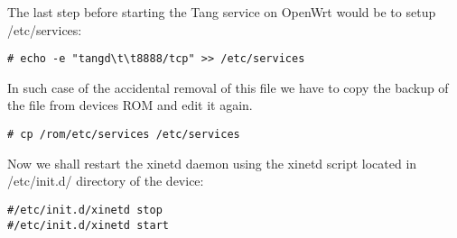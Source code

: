 The last step before starting the Tang service on OpenWrt would be to setup /etc/services:
\begin{lstlisting}[columns=fixed,basicstyle=\ttfamily\footnotesize,tabsize=4,backgroundcolor=\color{yellow!10}]
# echo -e "tangd\t\t8888/tcp" >> /etc/services
\end{lstlisting}
In such case of the accidental removal of this file we have to copy the backup of the file from devices ROM and edit it again.
\begin{lstlisting}[columns=fixed,basicstyle=\ttfamily\footnotesize,tabsize=4,backgroundcolor=\color{yellow!10}]
# cp /rom/etc/services /etc/services
\end{lstlisting}
Now we shall restart the xinetd daemon using the xinetd script located in /etc/init.d/ directory of the device:
\begin{lstlisting}[columns=fixed,basicstyle=\ttfamily\footnotesize,tabsize=4,backgroundcolor=\color{yellow!10}]
#/etc/init.d/xinetd stop
#/etc/init.d/xinetd start
\end{lstlisting}

